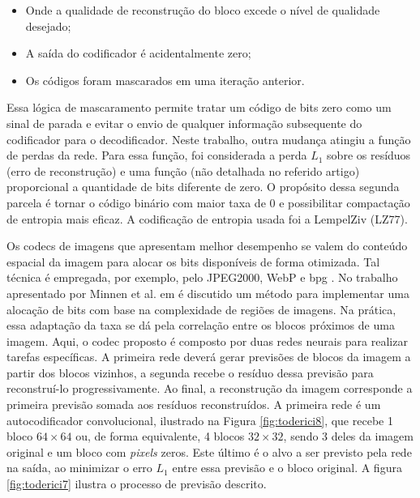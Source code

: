 \begin{itemize}
	\item  Onde a qualidade de reconstrução do bloco excede o nível de qualidade desejado;
	\item A saída do codificador é acidentalmente zero;
	\item Os códigos foram mascarados em uma iteração anterior.
\end{itemize}

Essa lógica de mascaramento permite tratar um código de bits zero como um sinal de parada e evitar o envio de qualquer informação subsequente do codificador para o decodificador.  Neste trabalho, outra mudança atingiu a função de perdas da rede. Para essa função, foi considerada a perda $L_1$ sobre os resíduos (erro de reconstrução) e uma função (não detalhada no referido artigo) proporcional a quantidade de bits diferente de zero. O propósito dessa segunda parcela  é tornar o código binário com maior taxa de 0 e possibilitar compactação de entropia mais eficaz. A codificação de entropia usada foi a LempelZiv (LZ77). 

Os \acrshort{codec}s de imagens que apresentam melhor desempenho se valem do conteúdo espacial da imagem para alocar os bits disponíveis de forma otimizada. Tal técnica é empregada, por exemplo, pelo JPEG2000, WebP e \acrshort{bpg} \cite{boliek2000information}. No trabalho apresentado por Minnen et al. em \cite{SpatiallyAdaptive2018Minnen} é discutido um método para implementar uma alocação de bits com base na complexidade de regiões de imagens. Na prática, essa adaptação da taxa se dá pela correlação entre os blocos próximos de uma imagem. Aqui, o \acrshort{codec} proposto é composto por duas redes neurais para realizar tarefas específicas. A primeira rede deverá gerar previsões de blocos da imagem a partir dos blocos vizinhos, a segunda recebe o resíduo dessa previsão para reconstruí-lo progressivamente. 
Ao final, a reconstrução da imagem corresponde a primeira previsão somada aos resíduos reconstruídos. A primeira rede é um autocodificador convolucional, ilustrado na Figura \ref{fig:toderici8}, que recebe 1 bloco $64 \times 64$ ou, de forma equivalente, 4 blocos $32 \times 32$, sendo 3 deles da imagem original e um bloco com \textit{pixels} zeros. Este último é o alvo a ser previsto pela rede na saída, ao minimizar o erro $L_1$ entre essa previsão e o bloco original.  A figura \ref{fig:toderici7} ilustra o processo de previsão descrito.     


